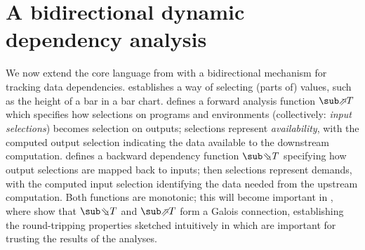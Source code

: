 \section{A bidirectional dynamic dependency analysis}
\label{sec:data-dependencies}

We now extend the core language from  with a bidirectional mechanism for tracking data dependencies.  establishes a way of selecting (parts of) values, such as the height of a bar in a bar chart.  defines a forward analysis function $\evalFwdF{T}$ which specifies how selections on programs and environments (collectively: \emph{input selections}) becomes selection on outputs; selections represent \emph{availability}, with the computed output selection indicating the data available to the downstream computation.  defines a backward dependency function $\evalBwdF{T}$ specifying how output selections are mapped back to inputs; then selections represent demands, with the computed input selection identifying the data needed from the upstream computation. Both functions are monotonic; this will become important in , where show that $\evalBwdF{T}$ and $\evalFwdF{T}$ form a Galois connection, establishing the round-tripping properties sketched intuitively in  which are important for trusting the results of the analyses.



